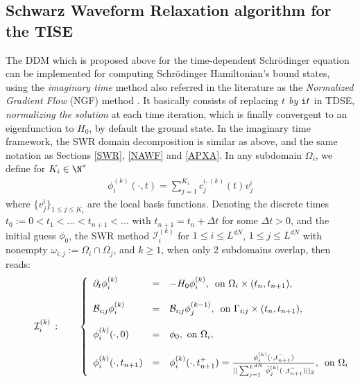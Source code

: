 \subsection{Schwarz Waveform Relaxation algorithm for the TISE}\label{SWR2}
The DDM which is proposed above for the time-dependent Schr\"odinger equation can be implemented for computing Schr\"odinger Hamiltonian's bound states, using the {\it imaginary time} method also referred in the literature as the {\it Normalized Gradient Flow} (NGF) method \cite{bao,lorin-TBS,lorin-TBS2}.  It basically consists of replacing {\it $t$ by ${\tt i}t$} in TDSE, {\it normalizing the solution} at each time iteration, which is finally convergent to an eigenfunction to $H_0$, by default the ground state. In the imaginary time framework, the SWR domain decomposition is similar as above, and the same notation as Sections \ref{SWR}, \ref{NAWF} and \ref{APXA}. In any subdomain $\Omega_i$, we define for $K_i \in \N^*$ %
\begin{eqnarray}\label{exp3}
\phi^{(k)}_i(\cdot,t) = \sum_{j=1}^{K_i}c_j^{i,(k)}(t)v_j^{i}
\end{eqnarray}
where $\big\{v^i_{j}\big\}_{1\leq j \leq K_i}$ are the local basis functions. Denoting the discrete times $t_{0}:=0<t_{1}<...<t_{n+1}<...$ with $t_{n+1}=t_n+\Delta t$ for some $\Delta t>0$, and the initial guess $\phi_{0}$, the SWR method $\mathcal{I}_i^{(k)}$ for $1\leq i\leq L^{dN}$, $1\leq j \leq L^{dN}$ with nonempty $\omega_{i;j}:=\Omega_i\cap \Omega_j$, and $k \geq 1$,  when only 2 subdomains overlap, then reads:
\begin{eqnarray}\label{SIT}
\hspace*{1cm}\mathcal{I}_i^{(k)} \,: \qquad \left\{
\begin{array}{lcl}
\partial_t \phi_i^{(k)} & = & -H_0 \phi_i^{(k)}, \, \hbox{ on }\Omega_i\times (t_{n},t_{n+1}), \\
\\
\mathcal{B}_{i;j}\phi_i^{(k)} & =& \mathcal{B}_{i;j}\phi_j^{(k-1)}, \, \hbox{ on } \Gamma_{i;j}\times (t_{n},t_{n+1}),\\
\\
\phi_i^{(k)}(\cdot,0) & = & \phi_0, \hbox{ on }\Omega_{i},\\
\\
\displaystyle \phi_i^{(k)}(\cdot,t_{n+1}) & =& \phi_i^{(k)}(\cdot,t^{+}_{n+1})=\frac{\phi_i^{(k)}(\cdot,t^{-}_{n+1})}{|| \sum_{j=1}^{L^{dN}}\tilde{\phi}_j^{(k)}(\cdot ,t^{-}_{n+1})||_{2}}, \, \hbox{ on }\Omega_i
\end{array}
\right.
\end{eqnarray}
